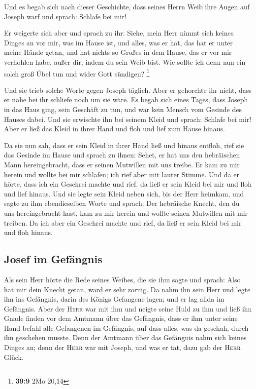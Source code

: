  Und es begab sich nach dieser Geschichte, dass seines
Herrn Weib ihre Augen auf Joseph warf und sprach: Schlafe bei mir!

 Er weigerte sich aber und sprach zu ihr: Siehe, mein Herr
nimmt sich keines Dinges an vor mir, was im Hause ist, und alles, was er
hat, das hat er unter meine Hände getan,  und hat nichts
so Großes in dem Hause, das er vor mir verhohlen habe, außer dir, indem
du sein Weib bist. Wie sollte ich denn nun ein solch groß Übel tun und
wider Gott sündigen? \footnote{\textbf{39:9} 2Mo 20,14}

 Und sie trieb solche Worte gegen Joseph täglich. Aber er
gehorchte ihr nicht, dass er nahe bei ihr schliefe noch um sie wäre.
 Es begab sich eines Tages, dass Joseph in das Haus ging,
sein Geschäft zu tun, und war kein Mensch vom Gesinde des Hauses dabei.
 Und sie erwischte ihn bei seinem Kleid und sprach:
Schlafe bei mir! Aber er ließ das Kleid in ihrer Hand und floh und lief
zum Hause hinaus.

 Da sie nun sah, dass er sein Kleid in ihrer Hand ließ
und hinaus entfloh,  rief sie das Gesinde im Hause und
sprach zu ihnen: Sehet, er hat uns den hebräischen Mann hereingebracht,
dass er seinen Mutwillen mit uns treibe. Er kam zu mir herein und wollte
bei mir schlafen; ich rief aber mit lauter Stimme.  Und
da er hörte, dass ich ein Geschrei machte und rief, da ließ er sein
Kleid bei mir und floh und lief hinaus.  Und sie legte
sein Kleid neben sich, bis der Herr heimkam,  und sagte
zu ihm ebendieselben Worte und sprach: Der hebräische Knecht, den du uns
hereingebracht hast, kam zu mir herein und wollte seinen Mutwillen mit
mir treiben.  Da ich aber ein Geschrei machte und rief,
da ließ er sein Kleid bei mir und floh hinaus.

\hypertarget{josef-im-gefuxe4ngnis}{%
\subsection{Josef im Gefängnis}\label{josef-im-gefuxe4ngnis}}

 Als sein Herr hörte die Rede seines Weibes, die sie ihm
sagte und sprach: Also hat mir dein Knecht getan, ward er sehr zornig.
 Da nahm ihn sein Herr und legte ihn ins Gefängnis, darin
des Königs Gefangene lagen; und er lag allda im Gefängnis.
 Aber der \textsc{Herr} war mit ihm und neigte seine Huld
zu ihm und ließ ihn Gnade finden vor dem Amtmann über das Gefängnis,
 dass er ihm unter seine Hand befahl alle Gefangenen im
Gefängnis, auf dass alles, was da geschah, durch ihn geschehen musste.
 Denn der Amtmann über das Gefängnis nahm sich keines
Dinges an; denn der \textsc{Herr} war mit Joseph, und was er tat, dazu
gab der \textsc{Herr} Glück.

